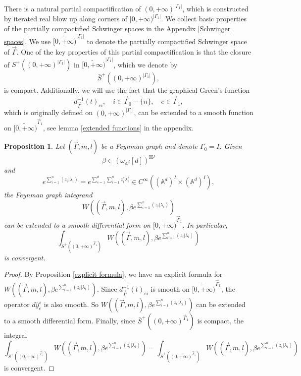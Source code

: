 \documentclass[11pt]{amsart}
\newtheorem{prop}[thm]{Proposition}
\theoremstyle{definition}
\theoremstyle{remark}
\numberwithin{equation}{section}
\begin{document}
There is a natural partial compactification of $(0,+\infty)^{|\Gamma_{1}|}$, which is constructed by iterated real
blow up along corners of $[0,+\infty)^{|\Gamma_{1}|}$. We collect basic properties of the partially compactified
Schwinger spaces in the Appendix \ref{Schwinger spaces}. We use $\widetilde{[0,+\infty)}^{|\Gamma_{1}|}$ to denote the partially compactified Schwinger space of $\vec{\Gamma}$.
One of the key properties of this partial compactification is that the closure of $S^{+}((0,+\infty)^{|\Gamma_{1}|})$
in $\widetilde{[0,+\infty)}^{|\Gamma_{1}|}$, which we denote by
    $$
    \bar{S}^{+}((0,+\infty)^{|\Gamma_{1}|}),
    $$
    is compact.
    Additionally, we will use the fact that the graphical Green's function
    \[
      d^{-1}_{\vec{\Gamma}}(t)_{ei}, \quad i\in \vec{\Gamma}_{0}-\{n\},\quad e\in \vec{\Gamma}_{1} ,
    \]
    which is originally defined on $(0,+\infty)^{|\Gamma_1|}$, can be extended to a smooth function on $\widetilde{[0,
    +\infty)}^{\vec{\Gamma}_{1}}$, see lemma \ref{extended functions} in the appendix.

\begin{prop}
    Let $(\vec{\Gamma},m,l)$ be a Feynman graph and denote $\Gamma_{0}= I$.
    Given
    $$
    \beta\in (\omega_{\mathbb{A}^{d}}[d])^{\boxtimes I}
    $$
    and
    $$
    e^{\sum\limits_{i=1}^{n}(z_{i}|\lambda_{i})}=e^{\sum\limits_{s=1}^{d}\sum\limits_{i=1}^{n}z^{s}_{i}\lambda^{s}_{i}}\in C^{\infty}((\mathbb{A}^{d})^{ I}\times (\mathbb{A}^{d})^{ I}),
    $$
    the Feynman graph integrand
    $$
    W((\vec{\Gamma},m,l),\beta e^{\sum\limits_{i=1}^{n}(z_{i}|\lambda_{i})})
    $$
    can be extended to a smooth differential form on $\widetilde{[0,+\infty)}^{\vec{\Gamma}_{1}}$. In particular,
    $$
    \int_{S^{+}((0,+\infty)^{\vec{\Gamma}_{1}})}W((\vec{\Gamma},m,l),\beta e^{\sum\limits_{i=1}^{n}(z_{i}|\lambda_{i})})
    $$
    is convergent.
\end{prop}
\begin{proof}
    By Proposition \ref{explicit formula}, we have an explicit formula for $
    W((\vec{\Gamma},m,l),\beta e^{\sum\limits_{i=1}^{n}(z_{i}|\lambda_{i})})
    $. Since $d^{-1}_{\vec{\Gamma}}(t)_{ei}$ is smooth on $\widetilde{[0,+\infty)}^{\vec{\Gamma}_{1}}$, the operator $d\hat{y}_{e}^{s}$ is also smooth. So $
    W((\vec{\Gamma},m,l),\beta e^{\sum\limits_{i=1}^{n}(z_{i}|\lambda_{i})})
    $ can be extended to a smooth differential form. Finally, since $\bar{S}^{+}((0,+\infty)^{\vec{\Gamma}_{1}})$ is compact, the integral
    $$
    \int_{S^{+}((0,+\infty)^{\vec{\Gamma}_{1}})}W((\vec{\Gamma},m,l),\beta e^{\sum\limits_{i=1}^{n}(z_{i}|\lambda_{i})})=
    \int_{\bar{S}^{+}((0,+\infty)^{\vec{\Gamma}_{1}})}W((\vec{\Gamma},m,l),\beta e^{\sum\limits_{i=1}^{n}(z_{i}|\lambda_{i})})
    $$
    is convergent.
\end{proof}
\end{document}
